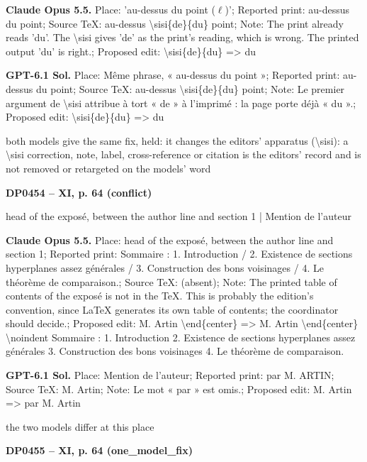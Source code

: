 \textbf{Claude Opus 5.5.} Place: 'au-dessus du point (\ensuremath{\ell})'; Reported print: au-dessus du point; Source TeX: au-dessus \textbackslash{}sisi\{de\}\{du\} point; Note: The print already reads 'du'. The \textbackslash{}sisi gives 'de' as the print's reading, which is wrong. The printed output 'du' is right.; Proposed edit: \textbackslash{}sisi\{de\}\{du\} =\allowbreak > du\par
\textbf{GPT-6.1 Sol.} Place: Même phrase, « au-dessus du point »; Reported print: au-dessus du point; Source TeX: au-dessus \textbackslash{}sisi\{de\}\{du\} point; Note: Le premier argument de \textbackslash{}sisi attribue à tort « de » à l'imprimé : la page porte déjà « du ».; Proposed edit: \textbackslash{}sisi\{de\}\{du\} =\allowbreak > du\par
both models give the same fix, held: it changes the editors' apparatus (\textbackslash{}sisi): a \textbackslash{}sisi correction, note, label, cross-reference or citation is the editors' record and is not removed or retargeted on the models' word\par
\par\noindent\hypertarget{DP0454}{}\textbf{DP0454 -- XI, p. 64 (conflict)}\par
head of the exposé, between the author line and section 1 | Mention de l'auteur\par
\textbf{Claude Opus 5.5.} Place: head of the exposé, between the author line and section 1; Reported print: Sommaire : 1. Introduction / 2. Existence de sections hyperplanes assez générales / 3. Construction des bons voisinages / 4. Le théorème de comparaison.; Source TeX: (absent); Note: The printed table of contents of the exposé is not in the TeX. This is probably the edition's convention, since LaTeX generates its own table of contents; the coordinator should decide.; Proposed edit: M. Artin  \textbackslash{}end\{center\} =\allowbreak > M. Artin  \textbackslash{}end\{center\}  \textbackslash{}noindent Sommaire :  1. Introduction  2. Existence de sections hyperplanes assez générales  3. Construction des bons voisinages  4. Le théorème de comparaison.\par
\textbf{GPT-6.1 Sol.} Place: Mention de l'auteur; Reported print: par M. ARTIN; Source TeX: M. Artin; Note: Le mot « par » est omis.; Proposed edit: M. Artin =\allowbreak > par M. Artin\par
the two models differ at this place\par
\par\noindent\hypertarget{DP0455}{}\textbf{DP0455 -- XI, p. 64 (one\_model\_fix)}\par
